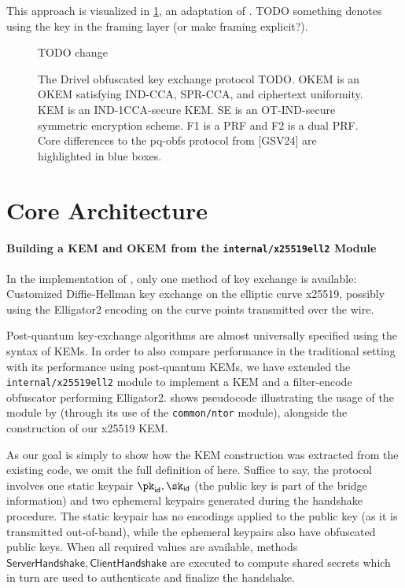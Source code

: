 This approach is visualized in \cref{fig:modified-drivel-framing}, an adaptation of \cite[Figure~6]{EPRINT:GRSV25}. TODO something denotes using the key in the framing layer (or make framing explicit?).

\begin{figure}
     TODO change
    \caption[
        The modified drivel TODO.
    ]{
        The Drivel obfuscated key exchange protocol TODO.
        OKEM is an OKEM satisfying IND-CCA, SPR-CCA, and ciphertext uniformity.
        KEM is an IND-1CCA-secure KEM.
        SE is an OT-IND-secure symmetric encryption scheme.
        F1 is a PRF and F2 is a dual PRF.
        Core differences to the pq-obfs protocol from [GSV24] are highlighted in blue boxes.
    }
    \label{fig:modified-drivel-framing}
\end{figure}

\section{Core Architecture} \label{sec:impl-architecture}

\paragraph{Building a KEM and OKEM from the \texttt{internal/x25519ell2} Module}

In the implementation of \obfsfour{}, only one method of key exchange is available: Customized Diffie-Hellman key exchange on the elliptic curve x25519, possibly using the \textsf{Elligator2} encoding on the curve points transmitted over the wire.

Post-quantum key-exchange algorithms are almost universally specified using the syntax of KEMs. In order to also compare \drivel{} performance in the traditional setting with its performance using post-quantum KEMs, we have extended the \texttt{internal/x25519ell2} module to implement a KEM and a filter-encode obfuscator performing \textsf{Elligator2}.  shows pseudocode illustrating the usage of the module by \obfsfour{} (through its use of the \texttt{common/ntor} module), alongside the construction of our x25519 KEM.

As our goal is simply to show how the KEM construction was extracted from the existing code, we omit the full definition of \obfsfour{} here. Suffice to say, the protocol involves one static keypair $\pk_\mathsf{id}, \sk_\mathsf{id}$ (the public key is part of the bridge information) and two ephemeral keypairs generated during the handshake procedure. The static keypair has no encodings applied to the public key (as it is transmitted out-of-band), while the ephemeral keypairs also have obfuscated public keys. When all required values are available, methods $\mathsf{ServerHandshake}, \mathsf{ClientHandshake}$ are executed to compute shared secrets which in turn are used to authenticate and finalize the handshake.

